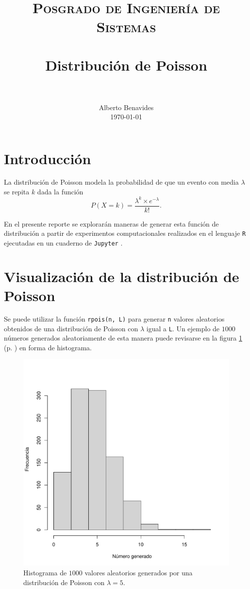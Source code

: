 \documentclass[paper=leter, fontsize=11pt]{scrartcl}
\title{
		\usefont{OT1}{bch}{b}{n}
		\normalfont \normalsize \textsc{Posgrado de Ingeniería de Sistemas} \\ [25pt]
		\horrule{0.5pt} \\[0.4cm]
		\huge Distribución de Poisson \\
		\horrule{2pt} \\[0.5cm]
}
\author{
		\normalfont 								\normalsize
        Alberto Benavides\\[-3pt]		\normalsize
        \today
}
\date{}
\numberwithin{equation}{section}		%
\numberwithin{figure}{section}			%
\numberwithin{table}{section}				%
\begin{document}
\maketitle

\section{Introducción}

La distribución de Poisson modela la probabilidad de que un evento con media $\lambda$ se repita $k$ dada la función
\begin{equation}
    P(X = k) = \frac{\lambda ^ k \times e ^ {- \lambda}}{k!}.
\end{equation}

En el presente reporte se explorarán maneras de generar esta función de distribución a partir de experimentos computacionales realizados en el lenguaje \texttt{R} \cite{r} ejecutadas en un cuaderno de \texttt{Jupyter} \cite{jupyter}.

\section{Visualización de la distribución de Poisson}

Se puede utilizar la función \texttt{rpois(n, L)} para generar \texttt{n} valores aleatorios obtenidos de una distribución de Poisson con $\lambda$ igual a \texttt{L}. Un ejemplo de $1000$ números generados aleatoriamente de esta manera puede revisarse en la figura \ref{poisson} (p. \pageref{poisson}) en forma de histograma.

\begin{figure}
    \centering
    \includegraphics[width=1\textwidth]{poisson.pdf}
    \caption{Histograma de $1000$ valores aleatorios generados por una distribución de Poisson con $\lambda = 5$.}
    \label{poisson}
\end{figure}
\end{document}
